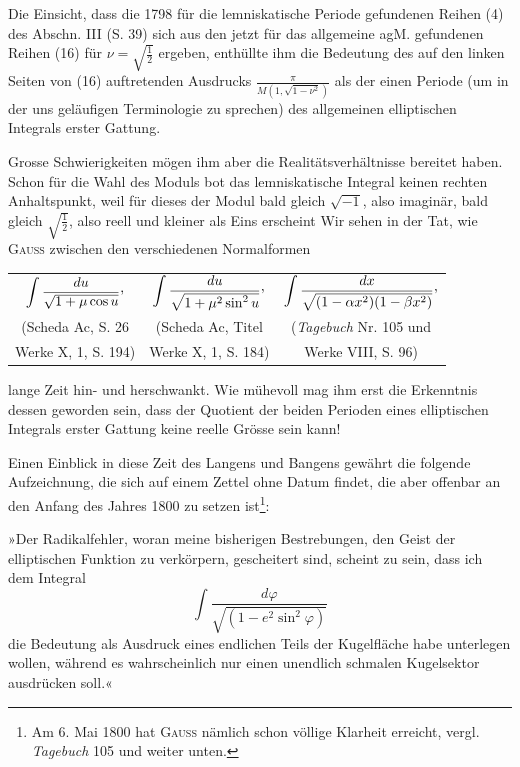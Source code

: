 Die Einsicht, dass die 1798 für die lemniskatische Periode gefundenen
Reihen (4) des Abschn. III (S. 39) sich aus den jetzt für das allgemeine agM.
gefundenen Reihen (16) für \(\nu=\sqrt{\tfrac12}\) ergeben, enthüllte ihm die Bedeutung des
auf den linken Seiten von (16) auftretenden Ausdrucks \(\frac\pi{M(1,\sqrt{1-\nu^2})}\) als der
einen Periode (um in der uns geläufigen Terminologie zu sprechen) des allgemeinen
elliptischen Integrals erster Gattung.

Grosse Schwierigkeiten mögen ihm aber die Realitätsverhältnisse bereitet
haben. Schon für die Wahl des Moduls bot das lemniskatische Integral keinen
rechten Anhaltspunkt, weil für dieses der Modul bald gleich \(\sqrt{-1}\), also imaginär,
bald gleich \(\sqrt{\tfrac12}\), also reell und kleiner als Eins erscheint Wir sehen
in der Tat, wie \textsc{Gauss} zwischen den verschiedenen Normalformen\par
\clearpage{}
\begin{center}\small
\begin{tabular}{@{}ccc@{}}
\(\displaystyle\int\frac{du}{\sqrt{1+\mu\cos u}}\mathpunct{\vcenter{\hbox{,}}}\)&
\(\displaystyle\int\frac{du}{\sqrt{1+\mu^2\sin^2u}}\mathpunct{\vcenter{\hbox{,}}}\)&
\(\displaystyle\int\frac{dx}{\sqrt{(1-\alpha x^2)(1-\beta x^2)}}\mathpunct{\vcenter{\hbox{,}}}\)\\
(Scheda Ac, S. 26&(Scheda Ac, Titel&(\textit{Tagebuch} Nr. 105 und\\
Werke X, 1, S. 194)&Werke X, 1, S. 184)&Werke VIII, S. 96)
\end{tabular}\end{center}
\noindent lange Zeit hin- und herschwankt. Wie mühevoll mag ihm erst die Erkenntnis
dessen geworden sein, dass der Quotient der beiden Perioden eines elliptischen
Integrals erster Gattung keine reelle Grösse sein kann!

Einen Einblick in diese Zeit des Langens und Bangens gewährt die folgende
Aufzeichnung, die sich auf einem Zettel ohne Datum findet, die aber
offenbar an den Anfang des Jahres 1800 zu setzen ist\footnote{Am 6. Mai 1800 hat \textsc{Gauss} nämlich schon völlige Klarheit erreicht, vergl. \textit{Tagebuch} 105 und weiter unten.}:

»Der Radikalfehler, woran meine bisherigen Bestrebungen, den Geist der
elliptischen Funktion zu verkörpern, gescheitert sind, scheint  zu sein,
dass ich dem Integral
\[
\int\frac{d\varphi}{\sqrt{(1-e^2\sin^2\varphi)}}
\]
\noindent die Bedeutung als Ausdruck eines endlichen Teils der Kugelfläche habe unterlegen
wollen, während es wahrscheinlich nur einen unendlich schmalen Kugelsektor
ausdrücken soll.«

